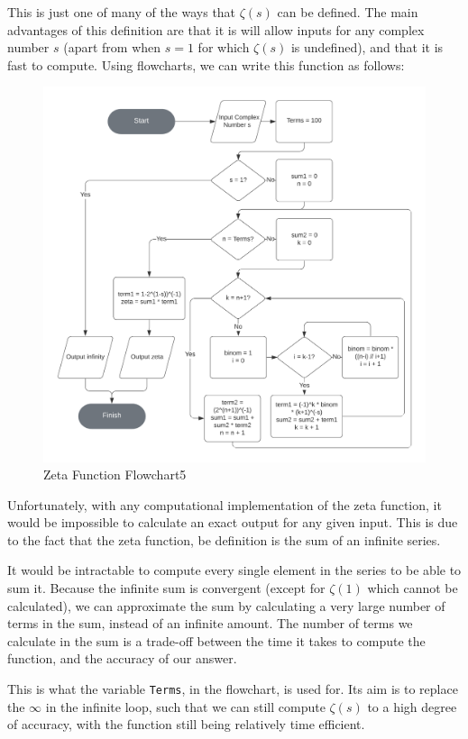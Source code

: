 \documentclass[12pt]{article}
\begin{document}
This is just one of many of the ways that $\zeta(s)$ can be defined. The main advantages of this definition are that it is will allow inputs for any complex number $s$ (apart from when $s = 1$ for which $\zeta(s)$ is undefined), and that it is fast to compute.
\clearpage
Using flowcharts, we can write this function as follows:
\begin{figure}[h]
    \centering
    \caption{Zeta Function Flowchart5}
    \captionsetup{justification=centering}
    \includegraphics[width=5in]{zeta-function-flowchart-two}
\end{figure}

Unfortunately, with any computational implementation of the zeta function, it would be impossible to calculate an exact output for any given input. This is due to the fact that the zeta function, be definition is the sum of an infinite series.

It would be intractable to compute every single element in the series to be able to sum it. Because the infinite sum is convergent (except for $\zeta(1)$ which cannot be calculated), we can approximate the sum by calculating a very large number of terms in the sum, instead of an infinite amount. The number of terms we calculate in the sum is a trade-off between the time it takes to compute the function, and the accuracy of our answer.

This is what the variable \texttt{Terms}, in the flowchart, is used for. Its aim is to replace the $\infty$ in the infinite loop, such that we can still compute $\zeta(s)$ to a high degree of accuracy, with the function still being relatively time efficient.
\end{document}
